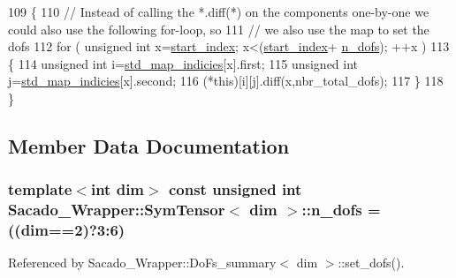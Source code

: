 \begin{DoxyCode}
109     \{
110         \textcolor{comment}{// Instead of calling the *.diff(*) on the components one-by-one we could also use the following
       for-loop, so}
111         \textcolor{comment}{// we also use the map to set the dofs}
112         \textcolor{keywordflow}{for} ( \textcolor{keywordtype}{unsigned} \textcolor{keywordtype}{int} x=\hyperlink{classSacado__Wrapper_1_1SymTensor_afe921e6044e4110fcfc848c52844d650}{start\_index}; x<(\hyperlink{classSacado__Wrapper_1_1SymTensor_afe921e6044e4110fcfc848c52844d650}{start\_index}+
      \hyperlink{classSacado__Wrapper_1_1SymTensor_a733bc4b029ff8d067b48e7ce3ee7606b}{n\_dofs}); ++x )
113         \{
114             \textcolor{keywordtype}{unsigned} \textcolor{keywordtype}{int} i=\hyperlink{classSacado__Wrapper_1_1SymTensor_ae3b1c56cde3fc5c7805b618ef3d9de75}{std\_map\_indicies}[x].first;
115             \textcolor{keywordtype}{unsigned} \textcolor{keywordtype}{int} j=\hyperlink{classSacado__Wrapper_1_1SymTensor_ae3b1c56cde3fc5c7805b618ef3d9de75}{std\_map\_indicies}[x].second;
116             (*this)[i][j].diff(x,nbr\_total\_dofs);
117         \}
118     \}
\end{DoxyCode}


\subsection{Member Data Documentation}
\subsubsection[{\texorpdfstring{n\+\_\+dofs}{n_dofs}}]{\setlength{\rightskip}{0pt plus 5cm}template$<$int dim$>$ const unsigned {\bf int} {\bf Sacado\+\_\+\+Wrapper\+::\+Sym\+Tensor}$<$ dim $>$\+::n\+\_\+dofs = ((dim==2)?3\+:6)\hspace{0.3cm}{\ttfamily [static]}}\hypertarget{classSacado__Wrapper_1_1SymTensor_a733bc4b029ff8d067b48e7ce3ee7606b}{}\label{classSacado__Wrapper_1_1SymTensor_a733bc4b029ff8d067b48e7ce3ee7606b}


Referenced by Sacado\+\_\+\+Wrapper\+::\+Do\+Fs\+\_\+summary$<$ dim $>$\+::set\+\_\+dofs().

